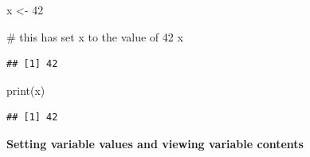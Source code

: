 \documentclass[a4paper]{book}
\newenvironment{Shaded}{}{}
\newcommand{\KeywordTok}[1]{\textcolor[rgb]{0.00,0.00,1.00}{{#1}}}
\newcommand{\DecValTok}[1]{{#1}}
\newcommand{\StringTok}[1]{\textcolor[rgb]{0.00,0.50,0.50}{{#1}}}
\newcommand{\CommentTok}[1]{\textcolor[rgb]{0.00,0.50,0.00}{{#1}}}
\newcommand{\NormalTok}[1]{{#1}}
\newlength{\leftbarwidth}
\newlength{\leftbarsep}
\newcommand*{\leftbarcolorcmd}{\color{darkgray}}%
\renewenvironment{leftbar}{%
    \def\FrameCommand{{\leftbarcolorcmd{\vrule width \leftbarwidth\relax\hspace {\leftbarsep}}}}%
    \MakeFramed {\advance \hsize -\width \FrameRestore }%
}{%
    \endMakeFramed
}
\renewenvironment{Shaded}
{\vspace{0em}\begin{leftbar}\begin{snugshade}}
{\end{snugshade}\end{leftbar}\vspace{0pt}}
\begin{document}
\begin{Shaded}
\begin{Highlighting}[]
\NormalTok{x <-}\StringTok{ }\DecValTok{42}

\CommentTok{# this has set x to the value of 42}
\NormalTok{x}
\end{Highlighting}
\end{Shaded}

\begin{verbatim}
## [1] 42
\end{verbatim}

\begin{Shaded}
\begin{Highlighting}[]
\KeywordTok{print}\NormalTok{(x)}
\end{Highlighting}
\end{Shaded}

\begin{verbatim}
## [1] 42
\end{verbatim}

\textbf{Setting variable values and viewing variable contents}
\end{document}
